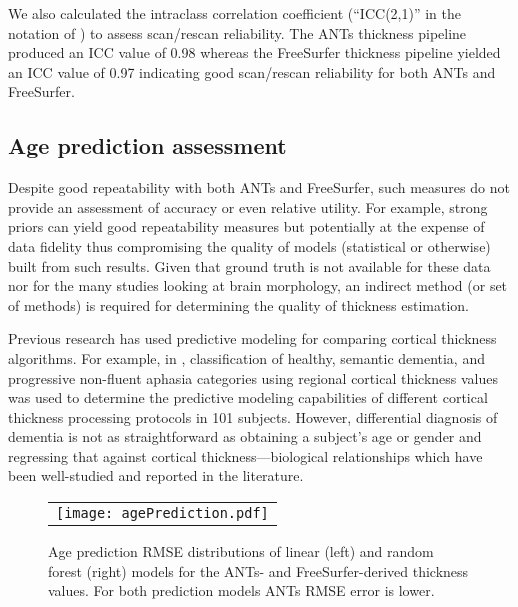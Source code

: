 We also calculated the intraclass correlation coefficient 
(``ICC(2,1)'' in the notation of \cite{shrout1979}) to assess 
scan/rescan reliability. The ANTs thickness pipeline produced an 
ICC value of 0.98 whereas the FreeSurfer thickness pipeline yielded
an ICC value of 0.97 indicating good scan/rescan reliability for
both ANTs and FreeSurfer.

\subsection{Age prediction assessment}

Despite good repeatability with both ANTs and FreeSurfer, such measures
do not provide an assessment of accuracy or even relative utility.  For example, 
strong priors can yield good repeatability measures but potentially at the expense 
of data fidelity thus compromising the quality of models (statistical or otherwise) 
built from such results.  Given that ground truth is not available for 
these data nor for the many studies looking at brain
morphology, an indirect method (or set of methods) is required for
determining the quality of thickness estimation.

Previous research has used predictive modeling for comparing cortical
thickness algorithms.  For example, in \cite{clarkson2011}, classification
of healthy, semantic dementia, and progressive non-fluent aphasia categories
using regional cortical thickness values was used to determine the predictive
modeling capabilities of different cortical thickness processing protocols in 
101 subjects. However, differential diagnosis of dementia 
\cite{neary2005} is not as straightforward as obtaining a subject's age
or gender and regressing that against cortical thickness---biological 
relationships which have been well-studied and reported in the literature.  

\begin{figure}[htb]
  \centering
  \begin{tabular}{c}
  \texttt{[image: agePrediction.pdf]} \\
  \end{tabular}
  \caption{Age prediction RMSE distributions of linear (left) and random forest (right)
           models for the ANTs- and FreeSurfer-derived thickness values.  For both prediction
           models ANTs RMSE error is lower.
           }
  \label{fig:agePrediction}
\end{figure}


